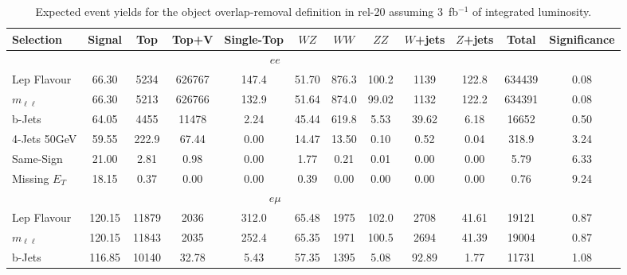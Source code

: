 \begin{table}[htb]
\caption{Expected event yields for the object overlap-removal definition in rel-20 assuming 3~fb$^{-1}$ of integrated luminosity.} 
\label{tab:OverlapRemovalR20}
\begin{center}{\scriptsize
          \begin{tabular}{l|c||ccc|ccc|cc|c||c}
            Selection 	& 	   Signal &  	   Top &     	   Top+V &   	Single-Top &      $WZ$ &      	  $WW$ &      	  $ZZ$ &     	   $W$+jets &  	   $Z$+jets &  	   Total &  Significance \\ \hline \hline
           \multicolumn{11}{c}{$ee$} \\ \hline
           Lep Flavour  &  	   66.30 &  	   5234 &  	   626767 &  	   147.4 &  	   51.70 &  	   876.3 &  	   100.2 &  	   1139 &  	   122.8 &  	   634439 & 	 0.08 \\
           $m_{\ell\ell}$ &  	   66.30 &  	   5213 &  	   626766 &  	   132.9 &  	   51.64 &  	   874.0 &  	   99.02 &  	   1132 &  	   122.2 &  	   634391 & 	 0.08 \\
           b-Jets       &  	   64.05 &  	   4455 &  	   11478 &  	   2.24 &  	   45.44 &  	   619.8 &  	   5.53 &  	   39.62 &  	   6.18 &  	   16652 & 	 0.50 \\
           4-Jets 50GeV &  	   59.55 &  	   222.9 &  	   67.44 &  	   0.00 &  	   14.47 &  	   13.50 &  	   0.10 &  	   0.52 &  	   0.04 &  	   318.9 & 	 3.24 \\
           Same-Sign    &  	   21.00 &  	   2.81 &  	   0.98 &  	   0.00 &  	   1.77 &  	   0.21 &  	   0.01 &  	   0.00 &  	   0.00 &  	   5.79 & 	 6.33 \\
           Missing $E_{T}$ &  	   18.15 &  	   0.37 &  	   0.00 &  	   0.00 &  	   0.39 &  	   0.00 &  	   0.00 &  	   0.00 &  	   0.00 &  	   0.76 & 	 9.24 \\
           \hline\multicolumn{11}{c}{$e\mu$} \\ \hline
           Lep Flavour  &  	   120.15 &  	   11879 &  	   2036 &  	   312.0 &  	   65.48 &  	   1975 &  	   102.0 &  	   2708 &  	   41.61 &  	   19121 & 	 0.87 \\
           $m_{\ell\ell}$ &  	   120.15 &  	   11843 &  	   2035 &  	   252.4 &  	   65.35 &  	   1971 &  	   100.5 &  	   2694 &  	   41.39 &  	   19004 & 	 0.87 \\
           b-Jets       &  	   116.85 &  	   10140 &  	   32.78 &  	   5.43 &  	   57.35 &  	   1395 &  	   5.08 &  	   92.89 &  	   1.77 &  	   11731 & 	 1.08 \\

\end{tabular}}
\end{center}
\end{table}
